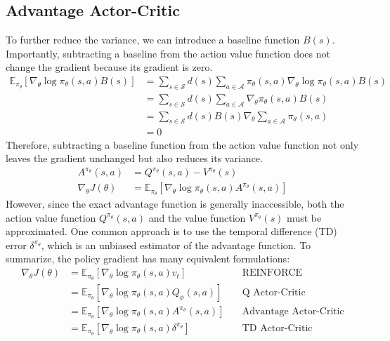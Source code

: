 \subsection{Advantage Actor-Critic}
To further reduce the variance, we can introduce a baseline function $B(s)$.
Importantly, subtracting a baseline from the action value function does not change the gradient because its gradient is zero.
\begin{equation}
  \begin{aligned}
    \mathbb{E}_{\pi_\theta} [\nabla_\theta \log \pi_\theta(s, a) B(s)]
    &= \sum_{s \in \mathcal{S}} d(s) \sum_{a \in \mathcal{A}} \pi_\theta(s, a) \nabla_\theta \log \pi_\theta(s, a) B(s) \\
    &= \sum_{s \in \mathcal{S}} d(s) \sum_{a \in \mathcal{A}} \nabla_\theta \pi_\theta(s, a) B(s) \\
    &= \sum_{s \in \mathcal{S}} d(s) B(s) \nabla_\theta \sum_{a \in \mathcal{A}} \pi_\theta(s, a) \\
    &= 0
  \end{aligned}
\end{equation}
Therefore, subtracting a baseline function from the action value function not only leaves the gradient unchanged but also reduces its variance.
\begin{equation} \label{chap2:eq:pg_adv}
  \begin{aligned}
    A^{\pi_\theta}(s, a) &= Q^{\pi_\theta}(s, a) - V^{\pi_\theta}(s) \\
    \nabla_\theta J(\theta) &= \mathbb{E}_{\pi_\theta} [\nabla_\theta \log \pi_\theta(s, a) A^{\pi_\theta}(s, a)]
  \end{aligned}
\end{equation}
However, since the exact advantage function is generally inaccessible, both the action value function $Q^{\pi_\theta}(s, a)$ and the value function $V^{\pi_\theta}(s)$ must be approximated.
One common approach is to use the temporal difference (TD) error $\delta^{\pi_\theta}$, which is an unbiased estimator of the advantage function.
To summarize, the policy gradient has many equivalent formulations:
\begin{equation}
  \begin{aligned}
    \nabla_\theta J(\theta)
    &= \mathbb{E}_{\pi_\theta}[\nabla_\theta \log \pi_\theta(s, a) v_t] &\quad \text{REINFORCE} \\
    &= \mathbb{E}_{\pi_\theta}[\nabla_\theta \log \pi_\theta(s, a) Q_\phi(s, a)] &\quad \text{Q Actor-Critic} \\
    &= \mathbb{E}_{\pi_\theta}[\nabla_\theta \log \pi_\theta(s, a) A^{\pi_\theta}(s, a)] &\quad \text{Advantage Actor-Critic} \\
    &= \mathbb{E}_{\pi_\theta}[\nabla_\theta \log \pi_\theta(s, a) \delta^{\pi_\theta}] &\quad \text{TD Actor-Critic}
  \end{aligned}
\end{equation}

